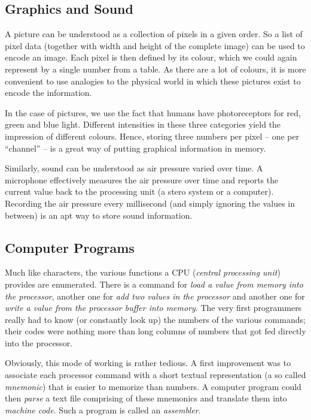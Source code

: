 \subsection{Graphics and Sound}
A picture can be understood as a collection of pixels in a given order. So a list of pixel data (together with width and height of the complete image) can be used to encode an image. Each pixel is then defined by its colour, which we could again represent by a single number from a table. As there are a lot of colours, it is more convenient to use analogies to the physical world in which these pictures exist to encode the information.

In the case of pictures, we use the fact that humans have photoreceptors for red, green and blue light. Different intensities in these three categories yield the impression of different colours. Hence, storing three numbers per pixel -- one per \enquote{channel} -- is a great way of putting graphical information in memory.

Similarly, sound can be understood as air pressure varied over time. A microphone effectively measures the air pressure over time and reports the current value back to the processing unit (\eg a stero system or a computer). Recording the air pressure every millisecond (and simply ignoring the values in between) is an apt way to store sound information.

\subsection{Computer Programs} \label{sec:assembly}
Much like characters, the various functions a CPU (\emph{central processing unit}) provides are enumerated. There is a command for \emph{load a value from memory into the processor}, another one for \emph{add two values in the processor} and another one for \emph{write a value from the processor buffer into memory}. The very first programmers really had to know (or constantly look up) the numbers of the various commands; their codes were nothing more than long columns of numbers that got fed directly into the processor.

Obviously, this mode of working is rather tedious. A first improvement was to associate each processor command with a short textual representation (a so called \emph{mnemonic}) that is easier to memorize than numbers. A computer program could then \emph{parse} a text file comprising of these mnemonics and translate them into \emph{machine code}. Such a program is called an \emph{assembler}.

